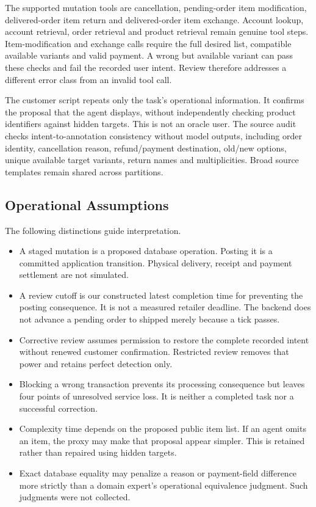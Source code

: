 The supported mutation tools are cancellation, pending-order item modification, delivered-order item return and delivered-order item exchange. Account lookup, account retrieval, order retrieval and product retrieval remain genuine tool steps. Item-modification and exchange calls require the full desired list, compatible available variants and valid payment. A wrong but available variant can pass these checks and fail the recorded user intent. Review therefore addresses a different error class from an invalid tool call.

The customer script repeats only the task's operational information. It confirms the proposal that the agent displays, without independently checking product identifiers against hidden targets. This is not an oracle user. The source audit checks intent-to-annotation consistency without model outputs, including order identity, cancellation reason, refund/payment destination, old/new options, unique available target variants, return names and multiplicities. Broad source templates remain shared across partitions.

\subsection{Operational Assumptions}
The following distinctions guide interpretation.
\begin{itemize}
\item A staged mutation is a proposed database operation. Posting it is a committed application transition. Physical delivery, receipt and payment settlement are not simulated.
\item A review cutoff is our constructed latest completion time for preventing the posting consequence. It is not a measured retailer deadline. The backend does not advance a pending order to shipped merely because a tick passes.
\item Corrective review assumes permission to restore the complete recorded intent without renewed customer confirmation. Restricted review removes that power and retains perfect detection only.
\item Blocking a wrong transaction prevents its processing consequence but leaves four points of unresolved service loss. It is neither a completed task nor a successful correction.
\item Complexity time depends on the proposed public item list. If an agent omits an item, the proxy may make that proposal appear simpler. This is retained rather than repaired using hidden targets.
\item Exact database equality may penalize a reason or payment-field difference more strictly than a domain expert's operational equivalence judgment. Such judgments were not collected.
\end{itemize}

